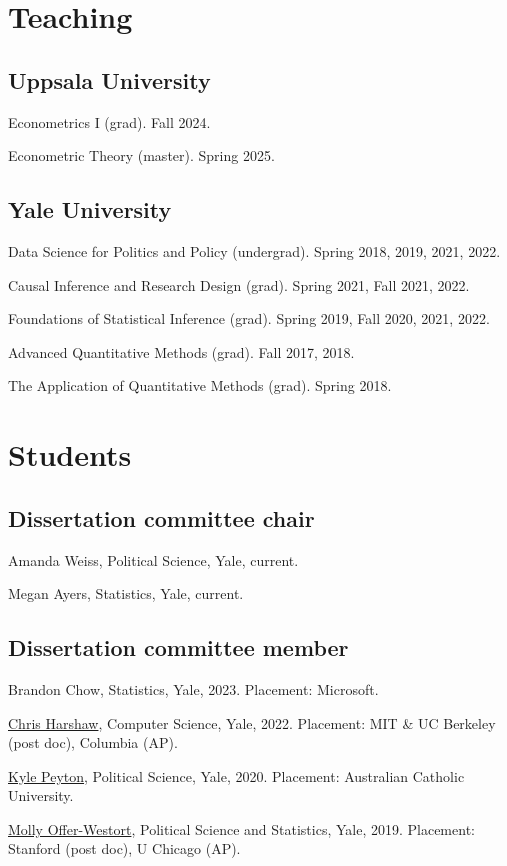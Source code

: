\documentclass[10pt,letterpaper]{article}
\newenvironment{infolist}{
	\begin{list}{}{
		\setlength{\parskip}{0pt}
		\setlength{\itemsep}{4pt}
		\setlength{\parsep}{0.3em}
		\setlength{\leftmargin}{0em}
		\setlength{\labelwidth}{0em}
		}
	}{
\end{list}
}
\newcommand{\infoitem}[1]{\item {#1}}
\begin{document}
	\section*{Teaching}

	\subsection*{Uppsala University}

	\begin{infolist}
		\infoitem{Econometrics I (grad). Fall 2024.}
		\infoitem{Econometric Theory (master). Spring 2025.}
	\end{infolist}

	\subsection*{Yale University}

	\begin{infolist}
		\infoitem{Data Science for Politics and Policy (undergrad). Spring 2018, 2019, 2021, 2022.}
		\infoitem{Causal Inference and Research Design (grad). Spring 2021, Fall 2021, 2022.}
		\infoitem{Foundations of Statistical Inference (grad). Spring 2019, Fall 2020, 2021, 2022.}
		\infoitem{Advanced Quantitative Methods (grad). Fall 2017, 2018.}
		\infoitem{The Application of Quantitative Methods (grad). Spring 2018.}
	\end{infolist}


	\section*{Students}

	\subsection*{Dissertation committee chair}

	\begin{infolist}
		\infoitem{Amanda Weiss, Political Science, Yale, current.}
		\infoitem{Megan Ayers, Statistics, Yale, current.}
	\end{infolist}

	\subsection*{Dissertation committee member}

	\begin{infolist}
		\infoitem{Brandon Chow, Statistics, Yale, 2023.
			Placement: Microsoft.}
		\infoitem{\href{http://www.chrisharshaw.com/}{Chris Harshaw}, Computer Science, Yale, 2022.
			Placement: MIT \& UC Berkeley (post doc), Columbia (AP).}
		\infoitem{\href{https://kylepeyton.github.io}{Kyle Peyton}, Political Science, Yale, 2020.
			Placement: Australian Catholic University.}
		\infoitem{\href{https://mollyow.github.io}{Molly Offer-Westort}, Political Science and Statistics, Yale, 2019.
			Placement: Stanford (post doc), U Chicago (AP).}
	\end{infolist}
\end{document}
